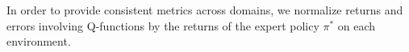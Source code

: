 \noindent In order to provide consistent metrics across domains, we normalize returns and errors involving Q-functions by the returns of the expert policy $\pi^*$ on each environment. 



